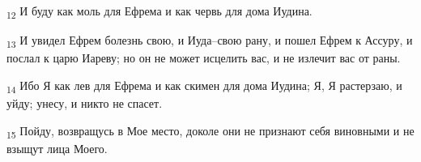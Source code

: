 \begin{tcolorbox}
\textsubscript{12} И буду как моль для Ефрема и как червь для дома Иудина.
\end{tcolorbox}
\begin{tcolorbox}
\textsubscript{13} И увидел Ефрем болезнь свою, и Иуда--свою рану, и пошел Ефрем к Ассуру, и послал к царю Иареву; но он не может исцелить вас, и не излечит вас от раны.
\end{tcolorbox}
\begin{tcolorbox}
\textsubscript{14} Ибо Я как лев для Ефрема и как скимен для дома Иудина; Я, Я растерзаю, и уйду; унесу, и никто не спасет.
\end{tcolorbox}
\begin{tcolorbox}
\textsubscript{15} Пойду, возвращусь в Мое место, доколе они не признают себя виновными и не взыщут лица Моего.
\end{tcolorbox}

